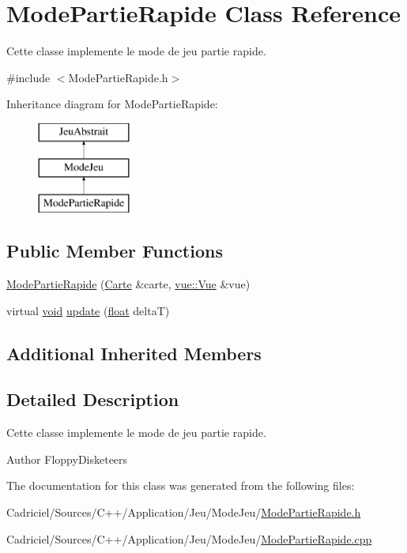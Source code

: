 \hypertarget{class_mode_partie_rapide}{\section{Mode\-Partie\-Rapide Class Reference}
\label{class_mode_partie_rapide}
}


Cette classe implemente le mode de jeu partie rapide.  




{\ttfamily \#include $<$Mode\-Partie\-Rapide.\-h$>$}

Inheritance diagram for Mode\-Partie\-Rapide\-:\begin{figure}[H]
\begin{center}
\leavevmode
\includegraphics[height=3.000000cm]{class_mode_partie_rapide}
\end{center}
\end{figure}
\subsection*{Public Member Functions}
\begin{DoxyCompactItemize}
\item 
\hyperlink{group__inf2990_ga8bab1f137340f96294686db099d5def8}{Mode\-Partie\-Rapide} (\hyperlink{class_carte}{Carte} \&carte, \hyperlink{classvue_1_1_vue}{vue\-::\-Vue} \&vue)
\item 
virtual \hyperlink{wglew_8h_aeea6e3dfae3acf232096f57d2d57f084}{void} \hyperlink{group__inf2990_gade3ae69aad6fa916631e29fd9be850c9}{update} (\hyperlink{fmod_8h_aeb841aa4b4b5f444b5d739d865b420af}{float} delta\-T)
\end{DoxyCompactItemize}
\subsection*{Additional Inherited Members}


\subsection{Detailed Description}
Cette classe implemente le mode de jeu partie rapide. 

\begin{DoxyAuthor}{Author}
Floppy\-Disketeers 
\end{DoxyAuthor}


The documentation for this class was generated from the following files\-:\begin{DoxyCompactItemize}
\item 
Cadriciel/\-Sources/\-C++/\-Application/\-Jeu/\-Mode\-Jeu/\hyperlink{_mode_partie_rapide_8h}{Mode\-Partie\-Rapide.\-h}\item 
Cadriciel/\-Sources/\-C++/\-Application/\-Jeu/\-Mode\-Jeu/\hyperlink{_mode_partie_rapide_8cpp}{Mode\-Partie\-Rapide.\-cpp}\end{DoxyCompactItemize}
